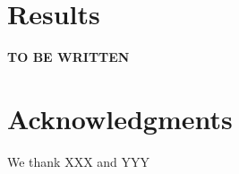 \documentclass[aps,prd,onecolumn,superscriptaddress,showpacs]{revtex4}
\begin{document}
\section{Results}

{\bf TO BE WRITTEN}

 




%
\section*{Acknowledgments}
We thank XXX and YYY

%
%

\def\Journal#1#2#3#4{{#1} {\bf #2}, #3 (#4)}
\def\NCA{Nuovo Cimento}
\def\NIM{Nucl. Instrum. Methods}
\def\NIMA{{Nucl. Instrum. Methods} A}
\def\NP{Nucl. Phys.} 
\def\NPB{{Nucl. Phys.} B}
\def\PLB{{Phys. Lett.}  B}
\def\PRL{Phys. Rev. Lett.}
\def\RPP{Rep. Prog. Phys.}
\def\PRD{{Phys. Rev.} D}
\def\PR{Phys. Rep.}
\def\PRP{Prog. Theor. Phys.}
\def\ZPC{{Z. Phys.} C}
\def\MPL{{Mod. Phys. Lett.} A}
\def\EPJC{{Eur. Phys. J.} C}
\def\CPC{Comput. Phys. Commun.}

\renewcommand{\baselinestretch}{1}
\end{document}
